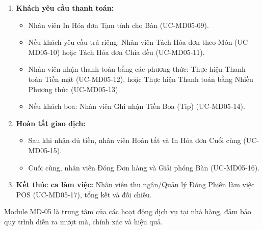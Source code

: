 \begin{enumerate}
\begin{itemize}
        \end{itemize}
    \item \textbf{Khách yêu cầu thanh toán:}
        \begin{itemize}
            \item Nhân viên In Hóa đơn Tạm tính cho Bàn (UC-MD05-09).
            \item Nếu khách yêu cầu trả riêng: Nhân viên Tách Hóa đơn theo Món (UC-MD05-10) hoặc Tách Hóa đơn Chia đều (UC-MD05-11).
            \item Nhân viên nhận thanh toán bằng các phương thức: Thực hiện Thanh toán Tiền mặt (UC-MD05-12), hoặc Thực hiện Thanh toán bằng Nhiều Phương thức (UC-MD05-13).
            \item Nếu khách boa: Nhân viên Ghi nhận Tiền Boa (Tip) (UC-MD05-14).
        \end{itemize}
    \item \textbf{Hoàn tất giao dịch:}
        \begin{itemize}
            \item Sau khi nhận đủ tiền, nhân viên Hoàn tất và In Hóa đơn Cuối cùng (UC-MD05-15).
            \item Cuối cùng, nhân viên Đóng Đơn hàng và Giải phóng Bàn (UC-MD05-16).
        \end{itemize}
    \item \textbf{Kết thúc ca làm việc:} Nhân viên thu ngân/Quản lý Đóng Phiên làm việc POS (UC-MD05-17), tổng kết và đối chiếu.
\end{enumerate}
Module MD-05 là trung tâm của các hoạt động dịch vụ tại nhà hàng, đảm bảo quy trình diễn ra mượt mà, chính xác và hiệu quả.

